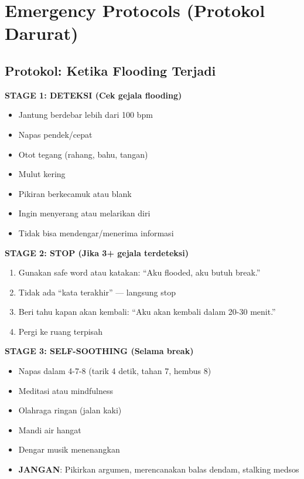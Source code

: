 \section{Emergency Protocols (Protokol Darurat)}

\subsection{Protokol: Ketika Flooding Terjadi}

\begin{warningbox}
\textbf{STAGE 1: DETEKSI (Cek gejala flooding)}
\begin{itemize}[itemsep=0.1cm]
    \item[$\square$] Jantung berdebar lebih dari 100 bpm
    \item[$\square$] Napas pendek/cepat
    \item[$\square$] Otot tegang (rahang, bahu, tangan)
    \item[$\square$] Mulut kering
    \item[$\square$] Pikiran berkecamuk atau blank
    \item[$\square$] Ingin menyerang atau melarikan diri
    \item[$\square$] Tidak bisa mendengar/menerima informasi
\end{itemize}

\textbf{STAGE 2: STOP (Jika 3+ gejala terdeteksi)}
\begin{enumerate}[itemsep=0.15cm]
    \item[$\square$] Gunakan safe word atau katakan: ``Aku flooded, aku butuh break.''
    \item[$\square$] Tidak ada ``kata terakhir'' --- langsung stop
    \item[$\square$] Beri tahu kapan akan kembali: ``Aku akan kembali dalam 20-30 menit.''
    \item[$\square$] Pergi ke ruang terpisah
\end{enumerate}

\textbf{STAGE 3: SELF-SOOTHING (Selama break)}
\begin{itemize}[itemsep=0.1cm]
    \item[$\square$] Napas dalam 4-7-8 (tarik 4 detik, tahan 7, hembus 8)
    \item[$\square$] Meditasi atau mindfulness
    \item[$\square$] Olahraga ringan (jalan kaki)
    \item[$\square$] Mandi air hangat
    \item[$\square$] Dengar musik menenangkan
    \item[$\square$] \textbf{JANGAN}: Pikirkan argumen, merencanakan balas dendam, stalking medsos
\end{itemize}


\end{warningbox}
